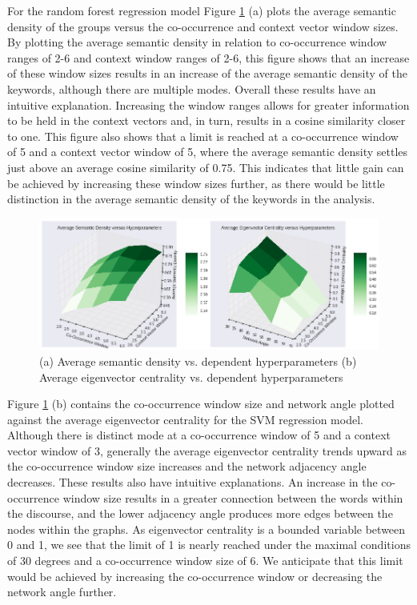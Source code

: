 \documentclass[11pt, a4paper]{article}
\begin{document}
For the random forest regression model Figure \ref{fig:EVC_SD_surface} (a) plots the average semantic density of the groups versus the co-occurrence  and context vector window sizes. By plotting the average semantic density in relation to  co-occurrence window ranges of 2-6 and context window ranges of 2-6, this figure shows that an increase of these window sizes results in an increase of the average semantic density of the keywords, although there are multiple modes. Overall these results have an intuitive explanation. Increasing the window ranges allows for greater information to be held in the context vectors and, in turn, results in a cosine similarity closer to one. This figure also shows that a limit is reached at a co-occurrence window of 5 and a context vector window of 5, where the average semantic density settles just above an average cosine similarity of 0.75. This indicates that little gain can be achieved by increasing these window sizes further, as there would be little distinction in the average semantic density of the keywords in the analysis.

\begin{figure}[!h]
\begin{center}
\includegraphics[width = \textwidth]{figs/EVC_SD_surface}
\caption{(a) Average semantic density vs. dependent hyperparameters (b) Average eigenvector centrality vs. dependent hyperparameters}
\label{fig:EVC_SD_surface}
\end{center}
\end{figure}

Figure \ref{fig:EVC_SD_surface} (b) contains the co-occurrence window size and network angle  plotted against the average eigenvector centrality for the SVM regression model.  Although there is distinct mode at a co-occurrence window of 5 and a context vector window of 3, generally the average eigenvector centrality trends upward as the co-occurrence window size increases and the network adjacency angle decreases. These results also have intuitive explanations. An increase in the co-occurrence window size results in a greater connection between the words within the discourse, and the lower adjacency angle produces more edges between the nodes within the graphs. As eigenvector centrality is a bounded variable between 0 and 1, we see that the limit of 1 is nearly reached under the maximal conditions of 30 degrees and a co-occurrence window size of 6. We anticipate that this limit would be achieved by increasing the co-occurrence window or decreasing the network angle further.
\end{document}
